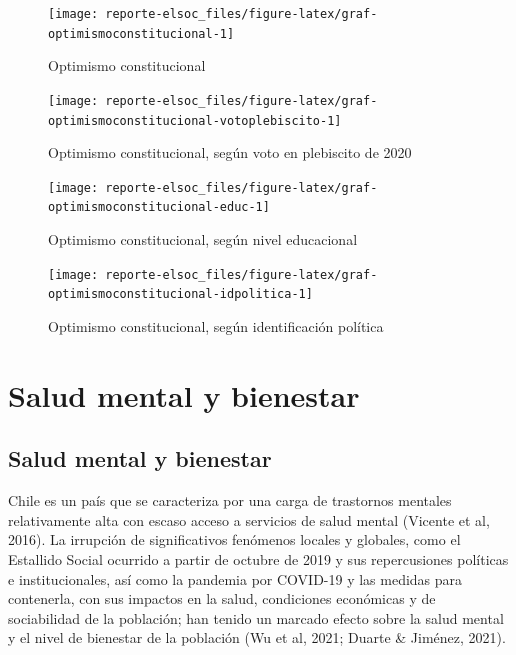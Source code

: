 \documentclass[
  12pt,
]{book}
\begin{document}
\begin{figure}

{\centering \texttt{[image: reporte-elsoc\_files/figure-latex/graf-optimismoconstitucional-1]} 

}

\caption{Optimismo constitucional}\label{fig:graf-optimismoconstitucional}
\end{figure}

\begin{figure}

{\centering \texttt{[image: reporte-elsoc\_files/figure-latex/graf-optimismoconstitucional-votoplebiscito-1]} 

}

\caption{Optimismo constitucional, según voto en plebiscito de 2020}\label{fig:graf-optimismoconstitucional-votoplebiscito}
\end{figure}

\begin{figure}

{\centering \texttt{[image: reporte-elsoc\_files/figure-latex/graf-optimismoconstitucional-educ-1]} 

}

\caption{Optimismo constitucional, según nivel educacional}\label{fig:graf-optimismoconstitucional-educ}
\end{figure}

\begin{figure}

{\centering \texttt{[image: reporte-elsoc\_files/figure-latex/graf-optimismoconstitucional-idpolitica-1]} 

}

\caption{Optimismo constitucional, según identificación política}\label{fig:graf-optimismoconstitucional-idpolitica}
\end{figure}

\hypertarget{salud-mental-y-bienestar}{%
\chapter{Salud mental y bienestar}\label{salud-mental-y-bienestar}}

\hypertarget{salud-mental-y-bienestar-1}{%
\section{Salud mental y bienestar}\label{salud-mental-y-bienestar-1}}

Chile es un país que se caracteriza por una carga de trastornos mentales relativamente alta con escaso acceso a servicios de salud mental (Vicente et al, 2016). La irrupción de significativos fenómenos locales y globales, como el Estallido Social ocurrido a partir de octubre de 2019 y sus repercusiones políticas e institucionales, así como la pandemia por COVID-19 y las medidas para contenerla, con sus impactos en la salud, condiciones económicas y de sociabilidad de la población; han tenido un marcado efecto sobre la salud mental y el nivel de bienestar de la población (Wu et al, 2021; Duarte \& Jiménez, 2021).
\end{document}
